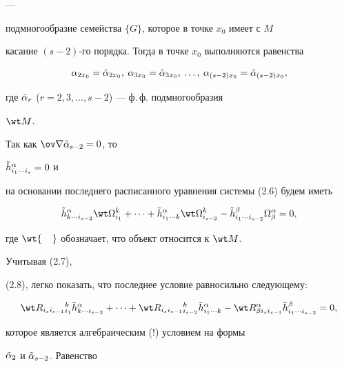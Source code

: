 --- 


подмногообразие семейства $\{G\}$, которое в точке $x_0$ имеет с $M$ 


касание $(s-2)$-го порядка. Тогда в точке $x_0$ выполняются равенства 


\begin{equation} 


\alpha_{2x_0}=\Tilde\alpha_{2x_0},\: 


\alpha_{3x_0}=\Tilde\alpha_{3x_0},\: 


\dotsc, \: 


\alpha_{(s-2)x_0}=\Tilde\alpha_{(s-2)x_0}, 


\end{equation} 


где $\Tilde\alpha_r$ ($r=2,3,\dotsc,s-2$) --- ф.\,ф. подмногообразия 


$\wt M$. 


Так как $\ov\na\Tilde\alpha_{s-2}=0$, то 


$\Tilde h^\alpha_{i_1\dotsb i_s}=0$ и 


на основании последнего расписанного уравнения системы (2.6) будем иметь 


$$ 


\Tilde h^\alpha_{k\dotsb i_{s-2}}\wt\Omega^k_{i_1}+\dotsb+ 


\Tilde h^\alpha_{i_1\dotsb k}\wt\Omega^k_{i_{s-2}}- 


\Tilde h^\beta_{i_1\dotsb i_{s-2}}\Omega^\alpha_\beta=0, 


$$ 


где $\wt{\phantom{M}}$ обозначает, что объект относится к $\wt M$. 


Учитывая (2.7), 


(2.8), легко показать, что последнее условие равносильно следующему: 


\begin{equation} 


\wt R_{i_si_{s-1}}{}^k_{i_1}\Tilde h^\alpha_{k\dotsb i_{s-2}}+ 


\dotsb + 


\wt R_{i_si_{s-1}}{}^k_{i_{s-2}}\Tilde h^\alpha_{i_1\dotsb k}- 


\wt R^\alpha_{\beta i_si_{s-1}}\Tilde h^\beta_{i_1\dotsb i_{s-2}}=0, 


\end{equation} 


которое является алгебраическим (!) условием на формы 


$\Tilde\alpha_2$ и $\Tilde\alpha_{s-2}$. Равенство 


